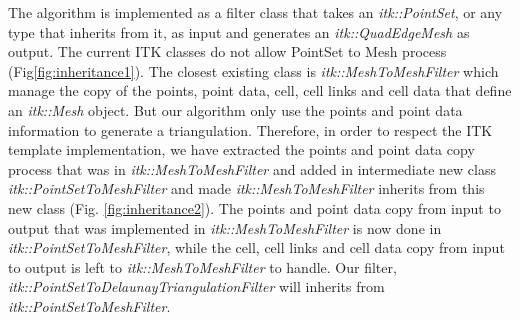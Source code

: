 \documentclass{InsightArticle}
\begin{document}
The algorithm is implemented as a filter class that takes an \emph{itk::PointSet}, or any type that inherits from it, as input and generates an \emph{itk::QuadEdgeMesh} as output. The current ITK classes do not allow PointSet to Mesh process (Fig\ref{fig:inheritance1}). The closest existing class is \emph{itk::MeshToMeshFilter} which manage the copy of the points, point data, cell, cell links and cell data that define an \emph{itk::Mesh} object. But our algorithm only use the points and point data information to generate a triangulation. Therefore, in order to respect the ITK template implementation, we have extracted the points and point data copy process that was in \emph{itk::MeshToMeshFilter} and added in intermediate new class \emph{itk::PointSetToMeshFilter} and made \emph{itk::MeshToMeshFilter} inherits from this new class (Fig. \ref{fig:inheritance2}). The points and point data copy from input to output that was implemented in \emph{itk::MeshToMeshFilter} is now done in \emph{itk::PointSetToMeshFilter}, while the cell, cell links and cell data copy from input to output is left to \emph{itk::MeshToMeshFilter} to handle. Our filter, \emph{itk::PointSetToDelaunayTriangulationFilter} will inherits from \emph{itk::PointSetToMeshFilter}.
\end{document}
